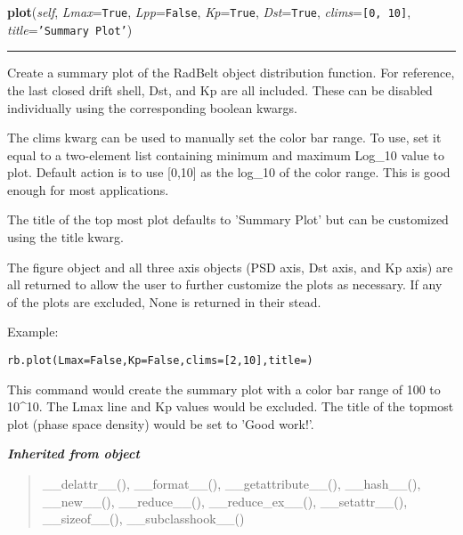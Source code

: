 \hspace{.8\funcindent}\begin{boxedminipage}{\funcwidth}

    \raggedright \textbf{plot}(\textit{self}, \textit{Lmax}={\tt True}, \textit{Lpp}={\tt False}, \textit{Kp}={\tt True}, \textit{Dst}={\tt True}, \textit{clims}={\tt \texttt{[}0\texttt{, }10\texttt{]}}, \textit{title}={\tt \texttt{'}\texttt{Summary Plot}\texttt{'}})

    \vspace{-1.5ex}

    \rule{\textwidth}{0.5\fboxrule}
\setlength{\parskip}{2ex}
    Create a summary plot of the RadBelt object distribution function. For 
    reference, the last closed drift shell, Dst, and Kp are all included.  
    These can be disabled individually using the corresponding boolean 
    kwargs.

    The clims kwarg can be used to manually set the color bar range. To 
    use, set it equal to a two-element list containing minimum and maximum 
    Log\_10 value to plot.  Default action is to use [0,10] as the log\_10 
    of the color range.  This is good enough for most applications.

    The title of the top most plot defaults to 'Summary Plot' but can be 
    customized using the title kwarg.

    The figure object and all three axis objects (PSD axis, Dst axis, and 
    Kp axis) are all returned to allow the user to further customize the 
    plots as necessary.  If any of the plots are excluded, None is returned
    in their stead.

    Example:

\begin{alltt}
\pysrcprompt{{\textgreater}{\textgreater}{\textgreater} }rb.plot(Lmax=False, Kp=False, clims=[2,10], title=)\end{alltt}
    This command would create the summary plot with a color bar range of 
    100 to 10{\textasciicircum}10.  The Lmax line and Kp values would be 
    excluded. The title of the topmost plot (phase space density) would be 
    set to 'Good work!'.

\setlength{\parskip}{1ex}
    \end{boxedminipage}


\large{\textbf{\textit{Inherited from object}}}

\begin{quote}
\_\_delattr\_\_(), \_\_format\_\_(), \_\_getattribute\_\_(), \_\_hash\_\_(), \_\_new\_\_(), \_\_reduce\_\_(), \_\_reduce\_ex\_\_(), \_\_setattr\_\_(), \_\_sizeof\_\_(), \_\_subclasshook\_\_()
\end{quote}

